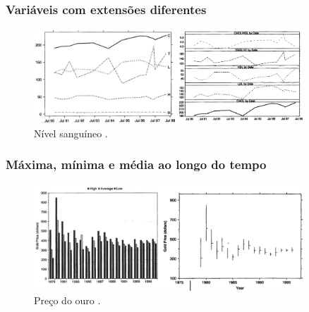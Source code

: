 \begin{frame}
\frametitle{Variáveis com extensões diferentes}
\begin{figure}[h]
 \centering
  \includegraphics[width=0.9\textwidth,height=0.7\textheight,keepaspectratio]{figures/range.png}
 \caption{Nível sanguíneo \cite{robbins_creating_2013}.}
 \label{fig-range}
\end{figure}
\end{frame}

\begin{frame}
\frametitle{Máxima, mínima e média ao longo do tempo}
\begin{figure}[h]
 \centering
  \includegraphics[width=0.9\textwidth,height=0.7\textheight,keepaspectratio]{figures/maxminmeanchart.png}
 \caption{Preço do ouro \cite{robbins_creating_2013}.}
 \label{fig-maxminmeanchart}
\end{figure}
\end{frame}

